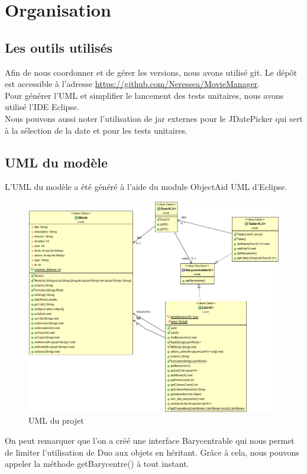 \section{Organisation}
\subsection{Les outils utilisés}

Afin de nous coordonner et de gérer les versions, nous avons utilisé git. Le dépôt est accessible à l'adresse \url{https://github.com/Neressea/MovieManager}. \\
Pour générer l'UML et simplifier le lancement des tests unitaires, nous avons utilisé l'IDE Eclipse. \\
Nous pouvons aussi noter l'utilisation de jar externes pour le JDatePicker qui sert à la sélection de la date et pour les tests unitaires.

\subsection{UML du modèle}

L'UML du modèle a été généré à l'aide du module ObjectAid UML d'Eclipse. \\


\begin{figure}[!ht]
    \includegraphics[width=1\textwidth]{./images/uml.png}
    \caption{UML du projet}
\end{figure}

On peut remarquer que l'on a créé une interface Barycentrable qui nous permet de limiter l'utilisation de Duo aux objets en héritant.
Grâce à cela, nous pouvons appeler la méthode getBarycentre() à tout instant.

